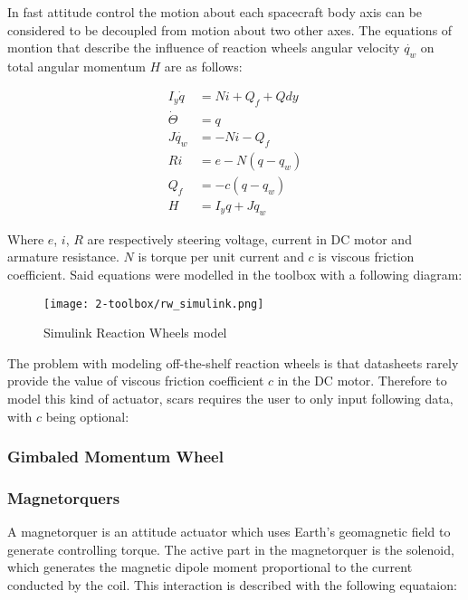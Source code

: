         In fast attitude control the motion about each spacecraft body axis can be considered to be decoupled from motion about two other axes. The equations of montion that describe the influence of reaction wheels angular velocity $\dot{q_w}$ on total angular momentum $H$ are as follows:
        
        \begin{align}
            I_y\dot{q} &= Ni+Q_f+Qdy\\
            \dot{\Theta} &= q\\
            J\dot{q_w} &= -Ni-Q_f\\
            Ri &= e - N(q-q_w)\\
            Q_f &= -c(q-q_w)\\
            H &= I_yq + Jq_w
        \end{align}

        Where $e$, $i$, $R$ are respectively steering voltage, current in DC motor and armature resistance. $N$ is torque per unit current and $c$ is viscous friction coefficient. Said equations were modelled in the toolbox with a following diagram: 
        
        \begin{figure}[hb]
            \centering
            \texttt{[image: 2-toolbox/rw\_simulink.png]}
            \caption{Simulink Reaction Wheels model}
            \label{fig:rw_simulink}
        \end{figure}

        The problem with modeling off-the-shelf reaction wheels is that datasheets rarely provide the value of viscous friction coefficient $c$ in the DC motor. Therefore to model this kind of actuator, \ac{scars} requires the user to only input following data, with $c$ being optional:

        
        \subsubsection{Gimbaled Momentum Wheel}



    \subsubsection{Magnetorquers}
        A magnetorquer is an attitude actuator which uses Earth's geomagnetic field to generate controlling torque. The active part in the magnetorquer is the solenoid, which generates the magnetic dipole moment proportional to the current conducted by the coil. This interaction is described with the following equataion:


